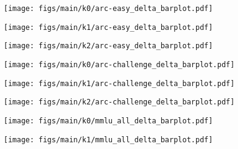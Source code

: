 \begin{figure}[b!]
    \centering
    \begin{minipage}{0.32\textwidth}
        \centering
        \texttt{[image: figs/main/k0/arc-easy\_delta\_barplot.pdf]}
    \end{minipage}\hfill
    \begin{minipage}{0.32\textwidth}
        \centering
        \texttt{[image: figs/main/k1/arc-easy\_delta\_barplot.pdf]}
    \end{minipage}\hfill
    \begin{minipage}{0.32\textwidth}
        \centering
        \texttt{[image: figs/main/k2/arc-easy\_delta\_barplot.pdf]}
    \end{minipage}
    \vspace{0.5cm} %
    \begin{minipage}{0.32\textwidth}
        \centering
        \texttt{[image: figs/main/k0/arc-challenge\_delta\_barplot.pdf]}
    \end{minipage}\hfill
    \begin{minipage}{0.32\textwidth}
        \centering
        \texttt{[image: figs/main/k1/arc-challenge\_delta\_barplot.pdf]}
    \end{minipage}\hfill
    \begin{minipage}{0.32\textwidth}
        \centering
        \texttt{[image: figs/main/k2/arc-challenge\_delta\_barplot.pdf]}
    \end{minipage}
    \vspace{0.5cm} %
    \begin{minipage}{0.32\textwidth}
        \centering
        \texttt{[image: figs/main/k0/mmlu\_all\_delta\_barplot.pdf]}
    \end{minipage}\hfill
    \begin{minipage}{0.32\textwidth}
        \centering
        \texttt{[image: figs/main/k1/mmlu\_all\_delta\_barplot.pdf]}
    \end{minipage}\hfill

\end{figure}
